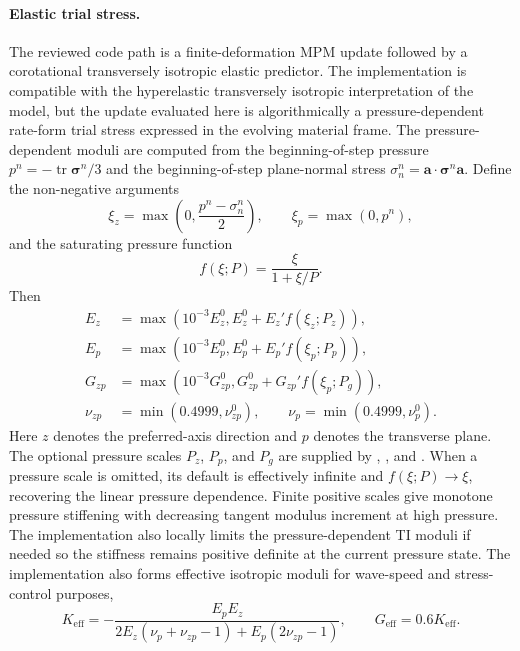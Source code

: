 \paragraph{Elastic trial stress.}
The reviewed code path is a finite-deformation MPM update followed by a corotational transversely isotropic elastic predictor.  The implementation is compatible with the hyperelastic transversely isotropic interpretation of the model, but the update evaluated here is algorithmically a pressure-dependent rate-form trial stress expressed in the evolving material frame.  The pressure-dependent moduli are computed from the beginning-of-step pressure \(p^n=-\operatorname{tr}\boldsymbol{\sigma}^n/3\) and the beginning-of-step plane-normal stress \(\sigma_n^n=\mathbf a\cdot\boldsymbol{\sigma}^n\mathbf a\).  Define the non-negative arguments
\begin{equation}
  \xi_z = \max\left(0,\frac{p^n-\sigma_n^n}{2}\right),
  \qquad
  \xi_p = \max(0,p^n),
  \label{eq:graphite-elastic-pressure-arguments}
\end{equation}
and the saturating pressure function
\begin{equation}
  f(\xi;P)=\frac{\xi}{1+\xi/P}.
  \label{eq:graphite-saturating-pressure-function}
\end{equation}
Then
\begin{align}
  E_z &= \max\left(10^{-3}E_z^0,
       E_z^0 + E_z' f(\xi_z;P_z)\right),\\
  E_p &= \max\left(10^{-3}E_p^0,
       E_p^0 + E_p' f(\xi_p;P_p)\right),\\
  G_{zp} &= \max\left(10^{-3}G_{zp}^0,
       G_{zp}^0 + G_{zp}' f(\xi_p;P_g)\right),\\
  \nu_{zp} &= \min(0.4999,\nu_{zp}^0),
  \qquad
  \nu_p = \min(0.4999,\nu_p^0).
  \label{eq:graphite-pressure-dependent-moduli}
\end{align}
Here \(z\) denotes the preferred-axis direction and \(p\) denotes the transverse plane.  The optional pressure scales \(P_z\), \(P_p\), and \(P_g\) are supplied by , , and .  When a pressure scale is omitted, its default is effectively infinite and \(f(\xi;P)\to\xi\), recovering the linear pressure dependence.  Finite positive scales give monotone pressure stiffening with decreasing tangent modulus increment at high pressure.  The implementation also locally limits the pressure-dependent TI moduli if needed so the stiffness remains positive definite at the current pressure state.  The implementation also forms effective isotropic moduli for wave-speed and stress-control purposes,
\begin{equation}
  K_{\mathrm{eff}} =
  -\frac{E_pE_z}{2E_z(\nu_p+\nu_{zp}-1)+E_p(2\nu_{zp}-1)},
  \qquad
  G_{\mathrm{eff}} = 0.6K_{\mathrm{eff}}.
  \label{eq:graphite-effective-moduli}
\end{equation}

